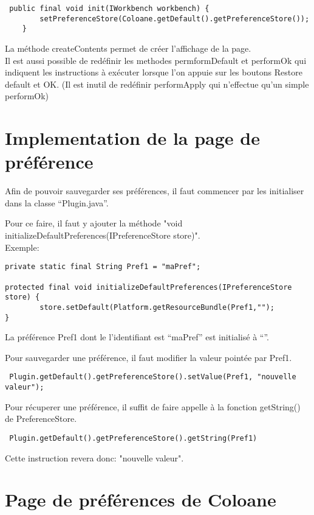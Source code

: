 \documentclass{article}
\begin{document}
\begin{verbatim}
 public final void init(IWorkbench workbench) {
		setPreferenceStore(Coloane.getDefault().getPreferenceStore());
	}
\end{verbatim}

La m\'ethode createContents permet de cr\'eer l'affichage de la page.\\

Il est aussi possible de red\'efinir les methodes permformDefault et performOk qui indiquent les instructions \`a ex\'ecuter lorsque l'on appuie sur les boutons Restore default et OK.
(Il est inutil de red\'efinir performApply qui n'effectue qu'un simple performOk)

\section{Implementation de la page de pr\'ef\'erence}

Afin de pouvoir sauvegarder ses pr\'ef\'erences, il faut commencer par les initialiser dans la classe ``Plugin.java''.

Pour ce faire, il faut y ajouter la m\'ethode "void initializeDefaultPreferences(IPreferenceStore store)".\\

Exemple:
\begin{verbatim}
private static final String Pref1 = "maPref";

protected final void initializeDefaultPreferences(IPreferenceStore store) {
		store.setDefault(Platform.getResourceBundle(Pref1,"");
}
\end{verbatim}

La pr\'ef\'erence Pref1 dont le l'identifiant est ``maPref'' est initialis\'e \`a ``''.

Pour sauvegarder une pr\'ef\'erence, il faut modifier la valeur point\'ee par Pref1.
\begin{verbatim}
 Plugin.getDefault().getPreferenceStore().setValue(Pref1, "nouvelle valeur");
\end{verbatim}

Pour r\'ecuperer une pr\'ef\'erence, il suffit de faire appelle \`a la fonction getString() de PreferenceStore.
\begin{verbatim}
 Plugin.getDefault().getPreferenceStore().getString(Pref1)
\end{verbatim}
Cette instruction revera donc: "nouvelle valeur".


\section{Page de pr\'ef\'erences de Coloane}
\end{document}
